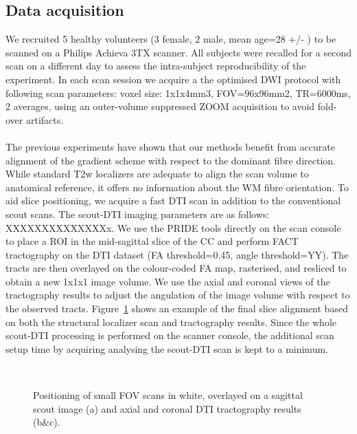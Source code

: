 \subsection*{Data acquisition}
We recruited 5 healthy volunteers (3 female, 2 male, mean age=28 +/- ) to be scanned on a Philips Achieva 3TX scanner. All subjects were recalled for a second scan on a different day to assess the intra-subject reproducibility of the experiment. In each scan session we acquire a the optimised \SF{} DWI protocol with following scan parameters: voxel size: 1x1x4mm3, FOV=96x96mm2, TR=6000ms, 2 averages, using an outer-volume suppressed ZOOM acquisition \citep{Wilm:2008} to avoid fold-over artifacts.  
\paragraph{}
The previous experiments have shown that our \SF{} methods benefit from accurate alignment of the gradient scheme with respect to the dominant fibre direction. While standard T2w localizers are adequate to align the scan volume to anatomical reference, it offers no information about the WM fibre orientation. To aid slice positioning, we acquire a fast DTI scan in addition to the conventional scout scans. The scout-DTI imaging parameters are as follows: XXXXXXXXXXXXXXx. We use the PRIDE tools directly on the scan console to place a ROI in the mid-sagittal slice of the CC and perform FACT tractography on the DTI dataset (FA threshold=0.45, angle threshold=YY). The tracts are then overlayed on the colour-coded FA map, rasterised, and resliced to obtain a new 1x1x1 image volume. We use the axial and coronal views of the tractography results to adjust the angulation of the \SF{} image volume with respect to the observed tracts.  Figure~\ref{fig:chap9 FOV positioning} shows an example of the final slice alignment based on both the structural localizer scan and tractography results. Since the whole scout-DTI processing is performed on the scanner console, the additional scan setup time by acquiring analysing the scout-DTI scan is kept to a minimum.

\begin{figure}[ht]
	\centering
	\begin{minipage}{0.35\textwidth}
	\\
	\end{minipage}\hspace{0.05\textwidth}
	\begin{minipage}{0.53\textwidth}
	\end{minipage}
	
	\caption{Positioning of small FOV scans in white, overlayed on a sagittal scout image (a) and axial and coronal DTI tractography results (b\&c).}
	\label{fig:chap9 FOV positioning}	
\end{figure}

